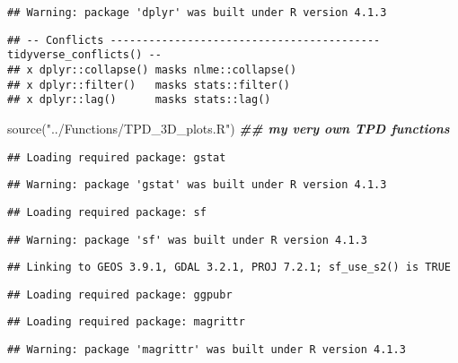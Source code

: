 \documentclass[
]{article}
\newenvironment{Shaded}{\begin{snugshade}}{\end{snugshade}}
\newcommand{\DocumentationTok}[1]{\textcolor[rgb]{0.56,0.35,0.01}{\textbf{\textit{#1}}}}
\newcommand{\FunctionTok}[1]{\textcolor[rgb]{0.00,0.00,0.00}{#1}}
\newcommand{\NormalTok}[1]{#1}
\newcommand{\StringTok}[1]{\textcolor[rgb]{0.31,0.60,0.02}{#1}}
\begin{document}
\begin{verbatim}
## Warning: package 'dplyr' was built under R version 4.1.3
\end{verbatim}

\begin{verbatim}
## -- Conflicts ------------------------------------------ tidyverse_conflicts() --
## x dplyr::collapse() masks nlme::collapse()
## x dplyr::filter()   masks stats::filter()
## x dplyr::lag()      masks stats::lag()
\end{verbatim}

\begin{Shaded}
\begin{Highlighting}[]
\FunctionTok{source}\NormalTok{(}\StringTok{"../Functions/TPD\_3D\_plots.R"}\NormalTok{) }\DocumentationTok{\#\# my very own TPD functions}
\end{Highlighting}
\end{Shaded}

\begin{verbatim}
## Loading required package: gstat
\end{verbatim}

\begin{verbatim}
## Warning: package 'gstat' was built under R version 4.1.3
\end{verbatim}

\begin{verbatim}
## Loading required package: sf
\end{verbatim}

\begin{verbatim}
## Warning: package 'sf' was built under R version 4.1.3
\end{verbatim}

\begin{verbatim}
## Linking to GEOS 3.9.1, GDAL 3.2.1, PROJ 7.2.1; sf_use_s2() is TRUE
\end{verbatim}

\begin{verbatim}
## Loading required package: ggpubr
\end{verbatim}

\begin{verbatim}
## Loading required package: magrittr
\end{verbatim}

\begin{verbatim}
## Warning: package 'magrittr' was built under R version 4.1.3
\end{verbatim}
\end{document}
